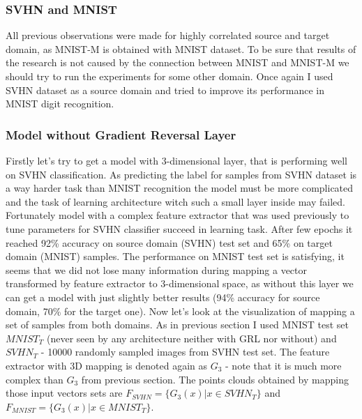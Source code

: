 \documentclass{article}
\begin{document}
\subsubsection{SVHN and MNIST}
\par
All previous observations were made for highly correlated source and target domain, as MNIST-M is obtained with MNIST dataset. To be sure that results of the research is not caused by the connection between MNIST and MNIST-M we should try to run the experiments for some other domain. Once again I used SVHN dataset as a source domain and tried to improve its performance in MNIST digit recognition. 
\subsubsection{Model without Gradient Reversal Layer}
\par
Firstly let's try to get a model with 3-dimensional layer, that is performing well on SVHN classification. As predicting the label for samples from SVHN dataset is a way harder task than MNIST recognition the model must be more complicated and the task of learning architecture witch such a small layer inside may failed. Fortunately model with a complex feature extractor that was used previously to tune parameters for SVHN classifier succeed in learning task. After few epochs it reached 92\% accuracy on source domain (SVHN) test set and 65\% on target domain (MNIST) samples. The performance on MNIST test set is satisfying, it seems that we did not lose many information during mapping a vector transformed by feature extractor to 3-dimensional space, as without this layer we can get a model with just slightly better results (94\% accuracy for source domain, 70\% for the target one). Now let's look at the visualization of mapping a set of samples from both domains. As in previous section I used MNIST test set $MNIST_{T}$ (never seen by any architecture neither with GRL nor without) and $SVHN_{T}$ - 10000 randomly sampled images from SVHN test set. The feature extractor with 3D mapping is denoted again as $G_{3}$ - note that it is much more complex than $G_{3}$ from previous section. The points clouds obtained by mapping those input vectors sets are $F_{SVHN} = \{ G_{3}(x) | x \in SVHN_{T} \}$  and $F_{MNIST} = \{ G_{3}(x) | x \in MNIST_{T} \}$.   
\end{document}

